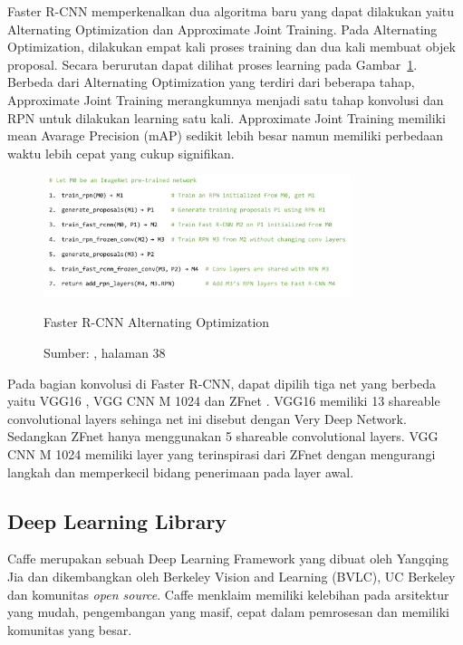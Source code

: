 Faster R-CNN memperkenalkan dua algoritma baru yang dapat dilakukan yaitu Alternating Optimization \cite{ren2015faster} dan Approximate Joint Training. Pada Alternating Optimization, dilakukan empat kali proses training dan dua kali membuat objek proposal. Secara berurutan dapat dilihat proses learning pada Gambar~\ref{fig:alt_opt}. Berbeda dari Alternating Optimization yang terdiri dari beberapa tahap, Approximate Joint Training merangkumnya menjadi satu tahap konvolusi dan RPN untuk dilakukan learning satu kali. Approximate Joint Training memiliki mean Avarage Precision (mAP) sedikit lebih besar namun memiliki perbedaan waktu lebih cepat yang cukup signifikan.

\begin{figure}[ht]
\centering
 \includegraphics[width=0.8\textwidth]{alt_opt}
 \caption{Faster R-CNN Alternating Optimization}
  \caption*{Sumber: \citet{girshick2015tutorial}, halaman 38}
 \label{fig:alt_opt}   
\end{figure}

Pada bagian konvolusi di Faster R-CNN, dapat dipilih tiga net yang berbeda yaitu VGG16 \cite{simonyan2014very}, VGG CNN M 1024 \cite{chatfield2014return} dan ZFnet \cite{zeiler2014visualizing}. VGG16 memiliki 13 shareable convolutional layers sehinga net ini disebut dengan Very Deep Network. Sedangkan ZFnet hanya menggunakan 5 shareable convolutional layers. VGG CNN M 1024 memiliki layer yang terinspirasi dari ZFnet dengan mengurangi langkah dan memperkecil bidang penerimaan pada layer awal.

\subsection{Deep Learning Library}

Caffe \citet{jia2014caffe} merupakan sebuah Deep Learning Framework yang dibuat oleh Yangqing Jia dan dikembangkan oleh Berkeley Vision and Learning (BVLC), UC Berkeley dan komunitas \textit{open source}. Caffe menklaim memiliki kelebihan pada arsitektur yang mudah, pengembangan yang masif, cepat dalam pemrosesan dan memiliki komunitas yang besar.

